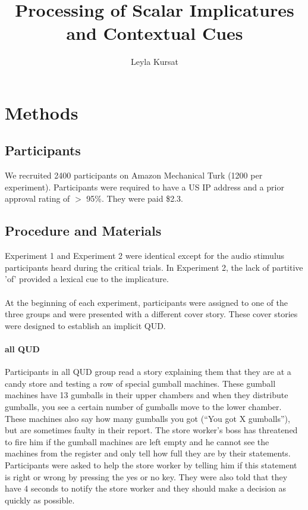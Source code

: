 \documentclass[12pt]{article}
\title{Processing of Scalar Implicatures and Contextual Cues}
\author{Leyla Kursat}
\begin{document}
 
\maketitle 

\section{Methods}
\subsection*{Participants}
We recruited 2400 participants on Amazon Mechanical Turk (1200 per experiment). Participants were required to have a US IP address and a prior approval rating of $>$ 95\%. They were paid \$2.3.

\subsection*{Procedure and Materials}
Experiment 1 and Experiment 2 were identical except for the audio stimulus participants heard during the critical trials. In Experiment 2, the lack of partitive 'of' provided a lexical cue to the implicature.

\paragraph{} At the beginning of each experiment, participants were assigned to one of the three groups and were presented with a different cover story. These cover stories were designed to establish an implicit QUD.

\paragraph{all QUD} Participants in all QUD group read a story explaining them that they are at a candy store and testing a row of special gumball machines. These gumball machines have 13 gumballs in their upper chambers and when they distribute gumballs, you see a certain number of gumballs move to the lower chamber. These machines also say how many gumballs you got (“You got X gumballs”), but are sometimes faulty in their report. The store worker’s boss has threatened to fire him if the gumball machines are left empty and he cannot see the machines from the register and only tell how full they are by their statements. Participants were asked to help the store worker by telling him if this statement is right or wrong by pressing the yes or no key. They were also told that they have 4 seconds to notify the store worker and they should make a decision as quickly as possible.
\end{document}
